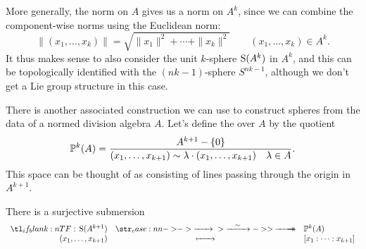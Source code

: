More generally, the norm on $A$ gives us a norm on $A^k$, since we can combine the component-wise norms using the Euclidean norm:
\[
  \|(x_1, \ldots, x_k)\| = \sqrt{\|x_1\|^2+\cdots+\|x_k\|^2}\quad\quad (x_1,\ldots,x_k)\in A^k.
\]
It thus makes sense to also consider the unit $k$-sphere $\S(A^k)$ in $A^k$, and this can be topologically identified with the $(nk-1)$-sphere $S^{nk-1}$, although we don't get a Lie group structure in this case.

There is another associated construction we can use to construct spheres from the data of a normed division algebra $A$. Let's define the  over $A$ by the quotient
\[
  \P^k(A) = \frac{A^{k+1} -\{0\}}{(x_1,\ldots, x_{k+1})\sim \lambda \cdot (x_1,\ldots, x_{k+1})\quad \lambda\in A}.
\]
This space can be thought of as consisting of lines passing through the origin in $A^{k+1}$. 

There is a surjective submersion
\[
  \lkxfunc{}{\S(A^{k+1})}{\P^{k}(A)}{(x_1,\ldots, x_{k+1})}{[x_1 : \cdots : x_{k+1}]}
\]
